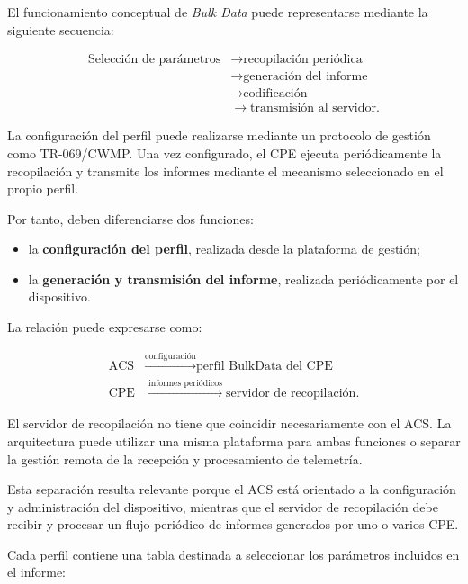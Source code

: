 El funcionamiento conceptual de \textit{Bulk Data} puede representarse
mediante la siguiente secuencia:

\[
\begin{aligned}
    \text{Selección de parámetros}
    &\longrightarrow
    \text{recopilación periódica}\\
    &\longrightarrow
    \text{generación del informe}\\
    &\longrightarrow
    \text{codificación}\\
    &\longrightarrow
    \text{transmisión al servidor}.
\end{aligned}
\]

La configuración del perfil puede realizarse mediante un protocolo de
gestión como TR-069/CWMP. Una vez configurado, el CPE ejecuta
periódicamente la recopilación y transmite los informes mediante el
mecanismo seleccionado en el propio perfil.

Por tanto, deben diferenciarse dos funciones:

\begin{itemize}
    \item la \textbf{configuración del perfil}, realizada desde la
    plataforma de gestión;

    \item la \textbf{generación y transmisión del informe}, realizada
    periódicamente por el dispositivo.
\end{itemize}

La relación puede expresarse como:

\[
\begin{aligned}
    \text{ACS}
    &\xrightarrow{\text{configuración}}
    \text{perfil BulkData del CPE}\\
    \text{CPE}
    &\xrightarrow{\text{informes periódicos}}
    \text{servidor de recopilación}.
\end{aligned}
\]

El servidor de recopilación no tiene que coincidir necesariamente con el
ACS. La arquitectura puede utilizar una misma plataforma para ambas
funciones o separar la gestión remota de la recepción y procesamiento de
telemetría.

Esta separación resulta relevante porque el ACS está orientado a la
configuración y administración del dispositivo, mientras que el servidor
de recopilación debe recibir y procesar un flujo periódico de informes
generados por uno o varios CPE.

Cada perfil contiene una tabla destinada a seleccionar los parámetros
incluidos en el informe:

